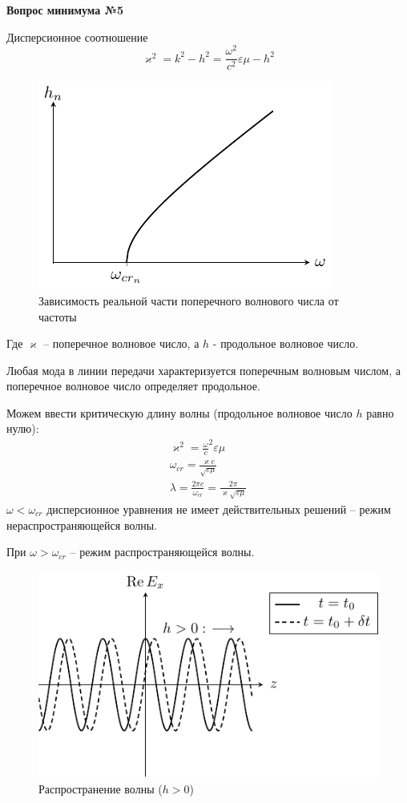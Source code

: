 \documentclass[a4paper,14pt]{extarticle}
\renewcommand{\epsilon}{\varepsilon}
\renewcommand{\kappa}{\varkappa}
\newcommand{\ticket}[1] {
\newpage
\hypertarget{num#1}{}
\begin{center}
	\textbf{Вопрос минимума №#1 }
\end{center}
}
\begin{document}
\ticket{5}
	Дисперсионное соотношение 
\begin{equation}
	\kappa^2 = k^2 - h^2 = \frac{\omega^2}{c^2}\epsilon\mu - h^2
\end{equation}
	\begin{figure}[h!]
		\centering
		\includegraphics[scale=1.6]{img/lect2_ris6}
		\caption{Зависимость реальной части поперечного волнового числа от частоты}
		\label{fig:wavegain:5}
	\end{figure}
	Где $\kappa$ -- поперечное волновое число, а $h$ - продольное волновое число. 
	
Любая мода в линии передачи характеризуется поперечным волновым числом, а поперечное волновое число определяет продольное.

Можем ввести критическую длину волны (продольное волновое число $h$ равно нулю):
\begin{gather*}
\kappa^2 = {\frac{\omega}{c}}^2 {\epsilon \mu}\\
\omega_{cr} = \frac{\kappa c}{\sqrt{\epsilon \mu}}\\
\lambda = \frac{2 \pi c}{\omega_{cr}} = \frac{2 \pi}{\kappa \sqrt{\epsilon \mu}}
\end{gather*}
$\omega < \omega_{cr}$ дисперсионное уравнения не имеет действительных решений -- режим нераспространяющейся волны. 

При  $\omega > \omega_{cr}$ -- режим распространяющейся волны.


\begin{figure}[h!]
	\centering
	\includegraphics[scale=1]{img/lect3_ris1}
	\caption{Распространение волны ($h>0$)}
	\label{fig:lect3:1}
\end{figure}
\end{document}
